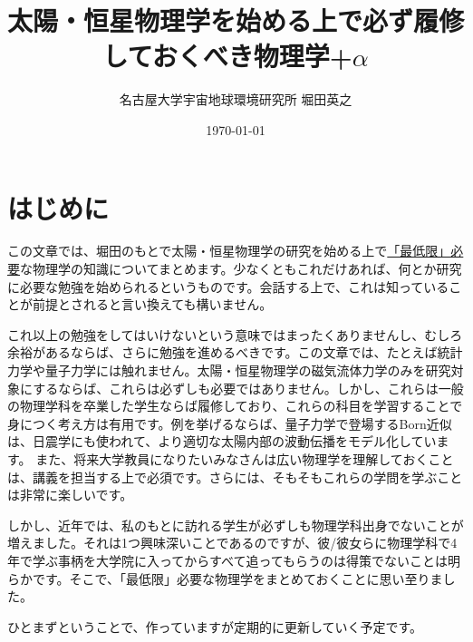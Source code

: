 \documentclass{ltjarticle}
\title{太陽・恒星物理学を始める上で必ず履修しておくべき物理学+$\alpha$}
\author{名古屋大学宇宙地球環境研究所 堀田英之}
\date{\today}
\begin{document}
\maketitle
\tableofcontents
\clearpage
\section{はじめに}
この文章では、堀田のもとで太陽・恒星物理学の研究を始める上で\underline{「最低限」必要}な物理学の知識についてまとめます。少なくともこれだけあれば、何とか研究に必要な勉強を始められるというものです。会話する上で、これは知っていることが前提とされると言い換えても構いません。\par
これ以上の勉強をしてはいけないという意味ではまったくありませんし、むしろ余裕があるならば、さらに勉強を進めるべきです。この文章では、たとえば統計力学や量子力学には触れません。太陽・恒星物理学の磁気流体力学のみを研究対象にするならば、これらは必ずしも必要ではありません。しかし、これらは一般の物理学科を卒業した学生ならば履修しており、これらの科目を学習することで身につく考え方は有用です。例を挙げるならば、量子力学で登場するBorn近似は、日震学にも使われて、より適切な太陽内部の波動伝播をモデル化しています。
また、将来大学教員になりたいみなさんは広い物理学を理解しておくことは、講義を担当する上で必須です。さらには、そもそもこれらの学問を学ぶことは非常に楽しいです。
\par
しかし、近年では、私のもとに訪れる学生が必ずしも物理学科出身でないことが増えました。それは1つ興味深いことであるのですが、彼/彼女らに物理学科で4年で学ぶ事柄を大学院に入ってからすべて追ってもらうのは得策でないことは明らかです。そこで、「最低限」必要な物理学をまとめておくことに思い至りました。
\par
ひとまずということで、作っていますが定期的に更新していく予定です。
\end{document}
